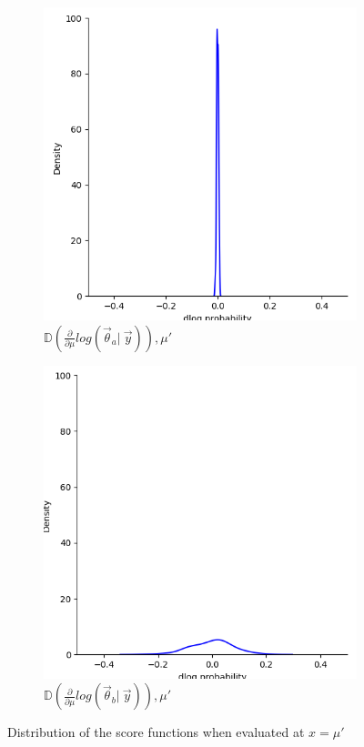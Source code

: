\begin{figure}[H]
    \centering
    \begin{subfigure}{0.475\textwidth}
        \includegraphics[width=\textwidth]{figs/background/deriv_dist_10.png}
        \caption[]{$\mathbb{D}\left(\frac{\partial}{\partial\mu} log(\vec{\theta}_a |\ \vec{y})\right), \mu'$}
    \end{subfigure}
    \begin{subfigure}{0.475\textwidth}
        \includegraphics[width=\textwidth]{figs/background/deriv_dist_0.5.png}
        \caption[]{$\mathbb{D}\left(\frac{\partial}{\partial\mu} log(\vec{\theta}_b |\ \vec{y})\right), \mu'$}
    \end{subfigure}
    \caption{Distribution of the score functions when evaluated at $x=\mu'$}
    \label{fig:scorefunctiondist}
\end{figure}
